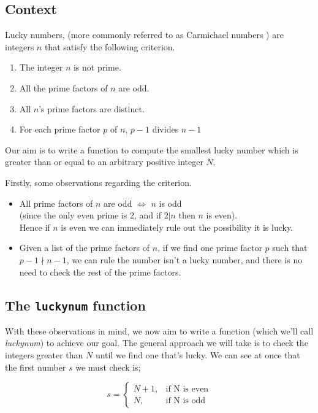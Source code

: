 \documentclass[10pt]{article}
\begin{document}
\subsection{Context}
Lucky numbers, (more commonly referred to as Carmichael numbers \cite{carmichael}) are integers $n$ that satisfy the following criterion.

\begin{enumerate}
\item The integer $n$ is not prime.
\item All the prime factors of $n$ are odd.
\item All $n$'s prime factors are distinct.
\item For each prime factor $p$ of $n$, $p - 1$ divides $n-1$ 
\end{enumerate}

Our aim is to write a function to compute the smallest lucky number which is greater than or equal to an arbitrary positive integer $N$. 

Firstly, some observations regarding the criterion.

\begin{itemize}

\item All prime factors of $n$ are odd $\iff$ $n$ is odd\\
 (since the only even prime is 2, and if $2|n$ then $n$ is even).\\
 
 Hence if $n$ is even we can immediately rule out the possibility it is lucky.
\item Given a list of the prime factors of $n$, if we find one prime factor $p$ such that $p -1 \nmid n-1$, we can rule the number isn't a lucky number, and there is no need to check the rest of the prime factors.
\end{itemize}

\subsection{The \texttt{luckynum} function}

With these observations in mind, we now aim to write a function (which we'll call \emph{luckynum}) to achieve our goal. The general approach  we will take is to check the integers greater than $N$ until we find one that's lucky. We can see at once that the first number $s$ we must check is;

$$ s = \begin{cases}
               N + 1,& \text{if N is even}\\
               N, & \text{if N is odd}
            \end{cases}
$$
\end{document}
